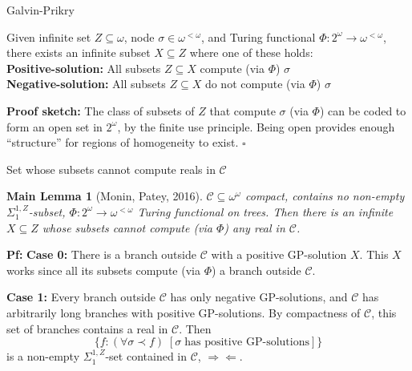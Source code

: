 \begin{frame}{Galvin-Prikry}
  \begin{fact*}
    Given infinite set $Z\subseteq\omega$, node $\sigma\in\omega^{<\omega}$,
    and Turing functional $\Phi:2^\omega\rightarrow \omega^{<\omega}$,
    there exists an infinite subset $X\subseteq Z$ where one of these
    holds:\\

    \vspace{1em}
    \textbf{Positive-solution:} All subsets $Z\subseteq X$ compute
    (via $\Phi$) $\sigma$\\
    \textbf{Negative-solution:} All subsets $Z\subseteq X$ do not compute
    (via $\Phi$) $\sigma$
  \end{fact*}

  \vspace{1em}
  \textbf{Proof sketch:} The class of subsets of $Z$ that compute $\sigma$
  (via $\Phi$) can be coded to form an open set in $2^\omega$, by the
  finite use principle. Being open provides enough ``structure'' for
  regions of homogeneity to exist. $\square$
\end{frame}

\begin{frame}{Set whose subsets cannot compute reals in $\mathcal{C}$}
  \newtheorem*{main-lemma*}{Main Lemma}
  \begin{main-lemma*}[Monin, Patey, 2016]
    $\mathcal{C}\subseteq\omega^\omega$ compact, contains no non-empty
    $\Sigma_1^{1,Z}$-subset, $\Phi:2^{\omega}\rightarrow \omega^{<\omega}$
    Turing functional on trees. Then there is an infinite $X\subseteq Z$
    whose subsets cannot compute (via $\Phi$) any real in $\mathcal{C}$.
  \end{main-lemma*}

  \vspace{0.5em}
  \textbf{Pf:} \textbf{Case 0:} There is a branch outside
  $\mathcal{C}$ with a positive GP-solution $X$. This $X$ works since
  all its subsets compute (via $\Phi$) a branch outside $\mathcal{C}$.

  \vspace{0.5em}
  \textbf{Case 1:} Every branch outside $\mathcal{C}$ has only negative
  GP-solutions, and $\mathcal{C}$ has arbitrarily long branches with
  positive GP-solutions. By compactness of $\mathcal{C}$, this set of
  branches contains a real in $\mathcal{C}$. Then
  \[\{f:(\forall \sigma\prec f)\; [\sigma\; \text{has
  positive GP-solutions}]\}\] is a non-empty $\Sigma_1^{1,Z}$-set contained
  in $\mathcal{C}$, $\Rightarrow\Leftarrow$.
\end{frame}

